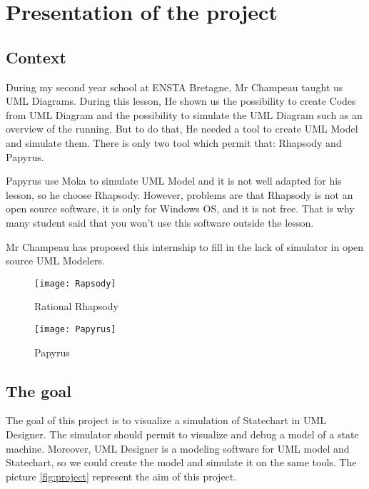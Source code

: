 
\chapter{Presentation of the project}

\section{Context}

During my second year school at ENSTA Bretagne, Mr Champeau taught us UML Diagrams. During this lesson, He shown us the possibility to create Codes from UML Diagram and the possibility to simulate the UML Diagram such as an overview of the running. But to do that, He needed a tool to create UML Model and simulate them. There is only two tool which permit that: Rhapsody and Papyrus.

Papyrus use Moka to simulate UML Model and it is not well adapted for his lesson, so he choose Rhapsody. However, problems are that Rhapsody is not an open source software, it is only for Windows OS, and it is not free. That is why many student said that you won't use this software outside the lesson.

Mr Champeau has proposed this internship to fill in the lack of simulator in open source UML Modelers.

  \begin{figure}[h]
    \begin{minipage}{0.45\linewidth}
      \centering
      \texttt{[image: Rapsody]}
      \caption{Rational Rhapsody}
      \label{fig:rhapsody}
    \end{minipage}\hfill
    \begin{minipage}{0.45\linewidth}
      \centering
      \texttt{[image: Papyrus]}
      \caption{Papyrus}
      \label{fig:papyrus}
    \end{minipage}
  \end{figure}



\section{The goal}

The goal of this project is to visualize a simulation of Statechart in UML Designer. The simulator should permit to visualize and debug a model of a state machine. Moreover, UML Designer is a modeling software for UML model and Statechart, so we could create the model and simulate it on the same tools. The picture \ref{fig:project} represent the aim of this project.

